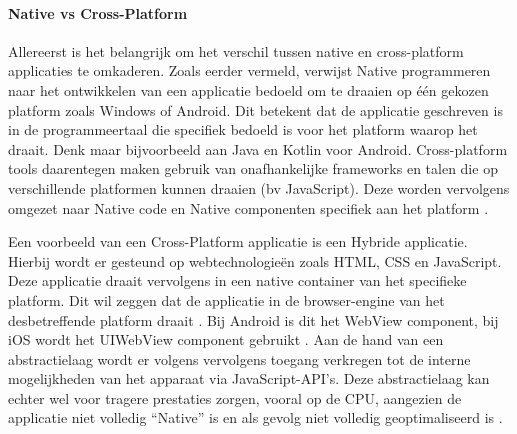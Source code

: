 \paragraph{Native vs Cross-Platform}
\newline
Allereerst is het belangrijk om het verschil tussen native en cross-platform applicaties te omkaderen. Zoals eerder vermeld, verwijst Native programmeren naar het ontwikkelen van een applicatie bedoeld om te draaien op één gekozen platform zoals Windows of Android. Dit betekent dat de applicatie geschreven is in de programmeertaal die specifiek bedoeld is voor het platform waarop het draait. Denk maar bijvoorbeeld aan Java en Kotlin voor Android. Cross-platform tools daarentegen maken gebruik van onafhankelijke frameworks en talen die op verschillende platformen kunnen draaien (bv JavaScript). Deze worden vervolgens omgezet naar Native code en Native componenten specifiek aan het platform \autocite{Bron2}.

Een voorbeeld van een Cross-Platform applicatie is een Hybride applicatie. Hierbij wordt er gesteund op webtechnologieën zoals HTML, CSS en JavaScript. Deze applicatie draait vervolgens in een native container van het specifieke platform. Dit wil zeggen dat de applicatie in de browser-engine van het desbetreffende platform draait \autocite{Bron6}. Bij Android is dit het WebView component, bij iOS wordt het UIWebView component gebruikt \autocite{Bron4}. Aan de hand van een abstractielaag wordt er volgens \textcite{Bron6} vervolgens toegang verkregen tot de interne mogelijkheden van het apparaat via JavaScript-API's. Deze abstractielaag kan echter wel voor tragere prestaties zorgen, vooral op de CPU, aangezien de applicatie niet volledig ``Native'' is en als gevolg niet volledig geoptimaliseerd is \autocite{Bron1}.

